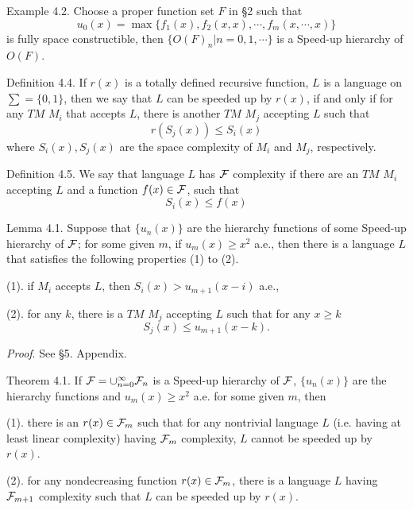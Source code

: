 Example 4.2. Choose a proper function set $F$ in \S2 such that
$$u_0(x)=\max\{f_1(x),f_2(x,x),\cdots,f_m(x,\cdots,x)\}$$
is fully space constructible, then $\{O(F)_n|n=0,1,\cdots\}$ is a 
Speed-up hierarchy of $O(F)$.

Definition 4.4. If $r(x)$ is a totally defined recursive 
function, $L$ is a language on $\sum=\{0,1\}$, then we say that 
$L$ can be speeded up by $r(x)$, if and only if for any $TM$ 
$M_i$ that accepts $L$, there is another $TM$ $M_j$ accepting $L$
such that
$$r(S_j(x))\le S_i(x)$$
where $S_i(x), S_j(x)$ are the space complexity of $M_i$ and 
$M_j$, respectively.

Definition 4.5. We say that language $L$ has ${\cal F}$ complexity 
if there are an $TM$ $M_i$ accepting $L$ and a function 
$f(x)\in{\cal F}$, such that
$$S_i(x)\le f(x)$$

Lemma 4.1. Suppose that $\{u_n(x)\}$ are the hierarchy functions of
some Speed-up hierarchy of ${\cal F}$; for some given $m$, if
$u_m(x)\ge x^2$ a.e., then there is a language $L$ that satisfies 
the following properties (1) to (2).

(1). if $M_i$ accepts $L$, then $S_i(x)>u_{m+1}(x-i)$ a.e.,



(2). for any $k$, there is a $TM$ $M_j$ accepting $L$ such that
for any $x\ge k$
$$S_j(x)\le u_{m+1}(x-k).$$

{\it Proof}. See \S5. Appendix.

Theorem 4.1. If ${\cal F}=\cup^\infty_{n=0}{\cal F}_n$ is a Speed-up 
hierarchy of ${\cal F}$, $\{u_n(x)\}$ are the hierarchy functions
and $u_m(x)\ge x^2$ a.e. for some given $m$, then

(1). there is an $r(x)\in{\cal F}_m$ such that for any nontrivial
language $L$ (i.e. having at least linear complexity) having 
${\cal F}_m$ complexity, $L$ cannot be speeded up by $r(x)$.


(2). for any nondecreasing function $r(x)\in{\cal F}_m$, there is a
language $L$ having ${\cal F}_{m+1}$ complexity such that $L$ can
be speeded up by $r(x)$.



